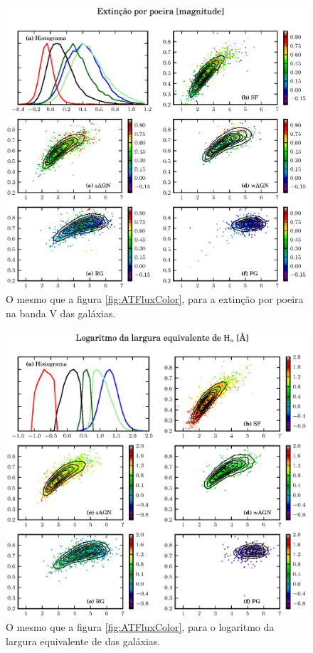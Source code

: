 \begin{figure}
	\includegraphics{figuras/uvcolor-color-AV-byclass.eps}
	\caption[Absorção por poeira no diagrama cor--cor UV.]
	{O mesmo que a figura \ref{fig:ATFluxColor}, para a extinção por
	poeira na banda V das galáxias.}
	\label{fig:AVColor}
\end{figure}

\begin{figure}
	\includegraphics{figuras/uvcolor-color-halpha_ew-byclass.eps}
	\caption[Largura equivalente de \Halpha no diagrama cor--cor UV.]
	{O mesmo que a figura \ref{fig:ATFluxColor}, para o logaritmo da largura
	equivalente de \Halpha das galáxias.}
	\label{fig:EWHaColor}
\end{figure}

